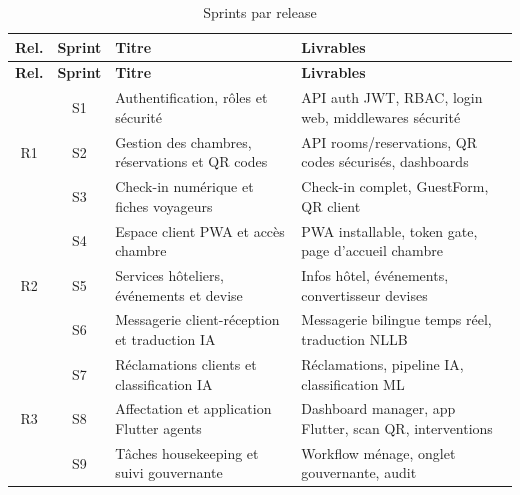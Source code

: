 
\begin{longtable}{|c|c|p{5.5cm}|p{6cm}|}
\caption{Sprints par release} \label{tab:sprints} \\
\hline
\textbf{Rel.} & \textbf{Sprint} & \textbf{Titre} & \textbf{Livrables} \\
\hline
\endfirsthead
\hline
\textbf{Rel.} & \textbf{Sprint} & \textbf{Titre} & \textbf{Livrables} \\
\hline
\endhead
\multirow{3}{*}{R1} & S1 & Authentification, rôles et sécurité & API auth JWT, RBAC, login web, middlewares sécurité \\
\cline{2-4}
 & S2 & Gestion des chambres, réservations et QR codes & API rooms/reservations, QR codes sécurisés, dashboards \\
\cline{2-4}
 & S3 & Check-in numérique et fiches voyageurs & Check-in complet, GuestForm, QR client \\
\hline
\multirow{3}{*}{R2} & S4 & Espace client PWA et accès chambre & PWA installable, token gate, page d'accueil chambre \\
\cline{2-4}
 & S5 & Services hôteliers, événements et devise & Infos hôtel, événements, convertisseur devises \\
\cline{2-4}
 & S6 & Messagerie client-réception et traduction IA & Messagerie bilingue temps réel, traduction NLLB \\
\hline
\multirow{3}{*}{R3} & S7 & Réclamations clients et classification IA & Réclamations, pipeline IA, classification ML \\
\cline{2-4}
 & S8 & Affectation et application Flutter agents & Dashboard manager, app Flutter, scan QR, interventions \\
\cline{2-4}
 & S9 & Tâches housekeeping et suivi gouvernante & Workflow ménage, onglet gouvernante, audit \\
\hline
\end{longtable}
